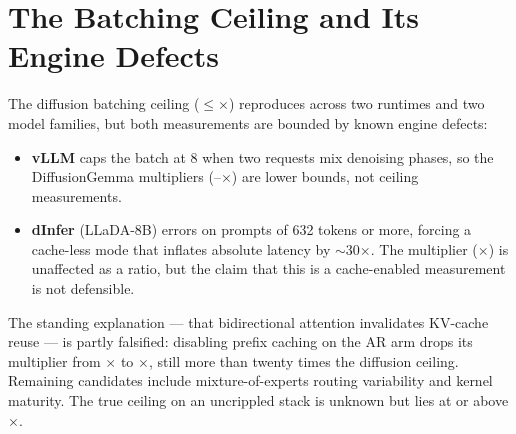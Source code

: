 \section{The Batching Ceiling and Its Engine Defects}
\label{app:batching}

The diffusion batching ceiling ($\leq$\dgBatchVllmHi$\times$) reproduces across
two runtimes and two model families, but both measurements are bounded by
known engine defects:

\begin{itemize}
\item \textbf{vLLM} caps the batch at 8 when two requests mix denoising
phases, so the DiffusionGemma multipliers
(\dgBatchVllmLo--\dgBatchVllmHi$\times$) are lower bounds, not ceiling
measurements.

\item \textbf{dInfer} (LLaDA-8B) errors on prompts of 632 tokens or more,
forcing a cache-less mode that inflates absolute latency by $\sim$30$\times$.
The multiplier (\dgBatchMult$\times$) is unaffected as a ratio, but the
claim that this is a cache-enabled measurement is not defensible.
\end{itemize}

The standing explanation --- that bidirectional attention invalidates KV-cache
reuse --- is partly falsified: disabling prefix caching on the AR arm drops
its multiplier from \cacheOnMult$\times$ to \cacheOffMult$\times$, still more
than twenty times the diffusion ceiling. Remaining candidates include
mixture-of-experts routing variability and kernel maturity. The true ceiling
on an uncrippled stack is unknown but lies at or above \dgBatchVllmHi$\times$.
